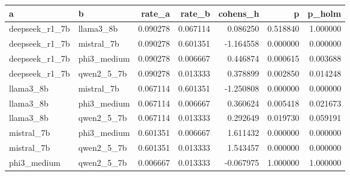 \begin{tabular}{llrrrrr}
\toprule
a & b & rate\_a & rate\_b & cohens\_h & p & p\_holm \\
\midrule
deepseek\_r1\_7b & llama3\_8b & 0.090278 & 0.067114 & 0.086250 & 0.518840 & 1.000000 \\
deepseek\_r1\_7b & mistral\_7b & 0.090278 & 0.601351 & -1.164558 & 0.000000 & 0.000000 \\
deepseek\_r1\_7b & phi3\_medium & 0.090278 & 0.006667 & 0.446874 & 0.000615 & 0.003688 \\
deepseek\_r1\_7b & qwen2\_5\_7b & 0.090278 & 0.013333 & 0.378899 & 0.002850 & 0.014248 \\
llama3\_8b & mistral\_7b & 0.067114 & 0.601351 & -1.250808 & 0.000000 & 0.000000 \\
llama3\_8b & phi3\_medium & 0.067114 & 0.006667 & 0.360624 & 0.005418 & 0.021673 \\
llama3\_8b & qwen2\_5\_7b & 0.067114 & 0.013333 & 0.292649 & 0.019730 & 0.059191 \\
mistral\_7b & phi3\_medium & 0.601351 & 0.006667 & 1.611432 & 0.000000 & 0.000000 \\
mistral\_7b & qwen2\_5\_7b & 0.601351 & 0.013333 & 1.543457 & 0.000000 & 0.000000 \\
phi3\_medium & qwen2\_5\_7b & 0.006667 & 0.013333 & -0.067975 & 1.000000 & 1.000000 \\
\bottomrule
\end{tabular}

